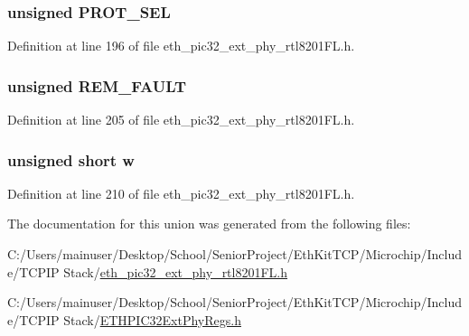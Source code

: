 \hypertarget{union_____a_n_l_p_a_dbits__t_a05f4c23498c1cea5cfbfbbbc964f044b}{}
\subsubsection[{P\+R\+O\+T\+\_\+\+S\+E\+L}]{\setlength{\rightskip}{0pt plus 5cm}unsigned P\+R\+O\+T\+\_\+\+S\+E\+L}\label{union_____a_n_l_p_a_dbits__t_a05f4c23498c1cea5cfbfbbbc964f044b}


Definition at line 196 of file eth\+\_\+pic32\+\_\+ext\+\_\+phy\+\_\+rtl8201\+F\+L.\+h.

\hypertarget{union_____a_n_l_p_a_dbits__t_acff720284bf641e0b589ea7feb2d3199}{}
\subsubsection[{R\+E\+M\+\_\+\+F\+A\+U\+L\+T}]{\setlength{\rightskip}{0pt plus 5cm}unsigned R\+E\+M\+\_\+\+F\+A\+U\+L\+T}\label{union_____a_n_l_p_a_dbits__t_acff720284bf641e0b589ea7feb2d3199}


Definition at line 205 of file eth\+\_\+pic32\+\_\+ext\+\_\+phy\+\_\+rtl8201\+F\+L.\+h.

\hypertarget{union_____a_n_l_p_a_dbits__t_a160850a4684a3e82c2323033964f2e98}{}
\subsubsection[{w}]{\setlength{\rightskip}{0pt plus 5cm}unsigned short w}\label{union_____a_n_l_p_a_dbits__t_a160850a4684a3e82c2323033964f2e98}


Definition at line 210 of file eth\+\_\+pic32\+\_\+ext\+\_\+phy\+\_\+rtl8201\+F\+L.\+h.



The documentation for this union was generated from the following files\+:\begin{DoxyCompactItemize}
\item 
C\+:/\+Users/mainuser/\+Desktop/\+School/\+Senior\+Project/\+Eth\+Kit\+T\+C\+P/\+Microchip/\+Include/\+T\+C\+P\+I\+P Stack/\hyperlink{eth__pic32__ext__phy__rtl8201_f_l_8h}{eth\+\_\+pic32\+\_\+ext\+\_\+phy\+\_\+rtl8201\+F\+L.\+h}\item 
C\+:/\+Users/mainuser/\+Desktop/\+School/\+Senior\+Project/\+Eth\+Kit\+T\+C\+P/\+Microchip/\+Include/\+T\+C\+P\+I\+P Stack/\hyperlink{_e_t_h_p_i_c32_ext_phy_regs_8h}{E\+T\+H\+P\+I\+C32\+Ext\+Phy\+Regs.\+h}\end{DoxyCompactItemize}
